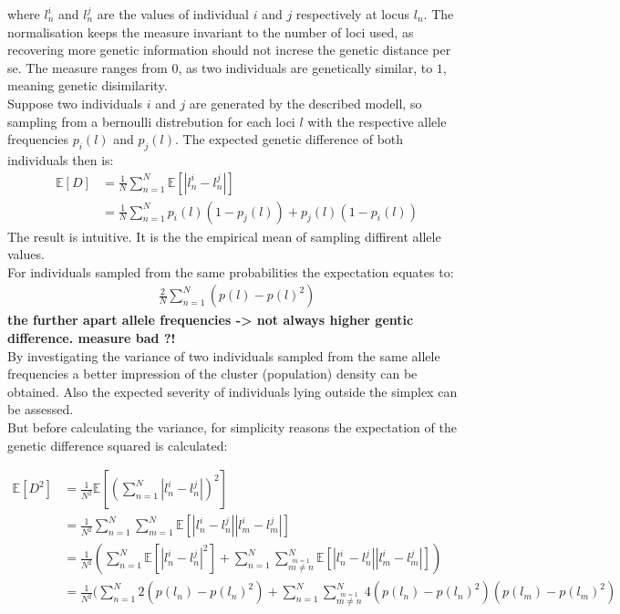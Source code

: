 \documentclass[a4paper, 11pt]{article}
\begin{document}
where $l^i_n$ and $l^j_n$ are the values of individual $i$ and $j$ respectively at locus $l_n$. The normalisation keeps the measure invariant to the number of loci used, as recovering more genetic information should not increse the genetic distance per se. The measure ranges from $0$, as two individuals are genetically similar, to $1$, meaning genetic disimilarity.
\\
Suppose two individuals $i$ and $j$ are generated by the described modell, so sampling from a bernoulli distrebution for each loci $l$ with the respective allele frequencies $p_i(l)$ and $p_j(l)$. The expected genetic difference of both individuals then is: 
\begin{align*}
\mathbb{E}[D] &= \frac{1}{N}\sum^{N}_{n = 1} \mathbb{E}[|l^i_n - l^j_n|] \\
&= \frac{1}{N} \sum^{N}_{n = 1} p_i(l)(1-p_j(l)) + p_j(l)(1-p_i(l))
\end{align*}
The result is intuitive. It is the the empirical mean of sampling diffirent allele values. \\
For individuals sampled from the same probabilities the expectation equates to:
\begin{align*}
\frac{2}{N} \sum^{N}_{n = 1} (p(l) - p(l)^2)
\end{align*}
\textbf{the further apart allele frequencies -> not always higher gentic difference. measure bad ?!}
\\
By investigating the variance of two individuals sampled from the same allele frequencies a better impression of the cluster (population) density can be obtained. Also the expected severity of individuals lying outside the simplex can be assessed. \\
But before calculating the variance, for simplicity reasons the expectation of the genetic difference squared is calculated:

\begin{align*}
\mathbb{E}[D^2] &= \frac{1}{N^2} \mathbb{E}[(\sum^{N}_{n = 1} |l^i_n - l^j_n|)^2] \\
&= \frac{1}{N^2} \sum^{N}_{n = 1}\sum^{N}_{m = 1}\mathbb{E}[ |l^i_n - l^j_n||l^i_m - l^j_m|] \\
&= \frac{1}{N^2}( \sum^{N}_{n = 1}\mathbb{E}[|l^i_n - l^j_n|^2] + \sum^{N}_{n = 1}\sum^{N}_{\overset{m = 1}{m \neq n}} \mathbb{E}[|l^i_n - l^j_n||l^i_m - l^j_m|]) \\
&= \frac{1}{N^2}( \sum^{N}_{n = 1}2(p(l_n) - p(l_n)^2) + \sum^{N}_{n = 1}\sum^{N}_{\overset{m = 1}{m \neq n}} 4(p(l_n)-p(l_n)^2)(p(l_m)-p(l_m)^2) \\
\end{align*}
\end{document}
